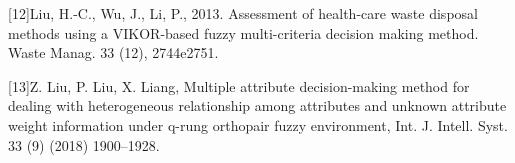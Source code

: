 \begin{flushleft}
\item{[12]}Liu, H.-C., Wu, J., Li, P., 2013. Assessment of health-care waste disposal methods
using a VIKOR-based fuzzy multi-criteria decision making method. Waste
Manag. 33 (12), 2744e2751.
\item{[13]}Z. Liu, P. Liu, X. Liang, Multiple attribute decision-making method for
dealing with heterogeneous relationship among attributes and unknown
attribute weight information under q-rung orthopair fuzzy environment,
Int. J. Intell. Syst. 33 (9) (2018) 1900–1928.

\end{flushleft}